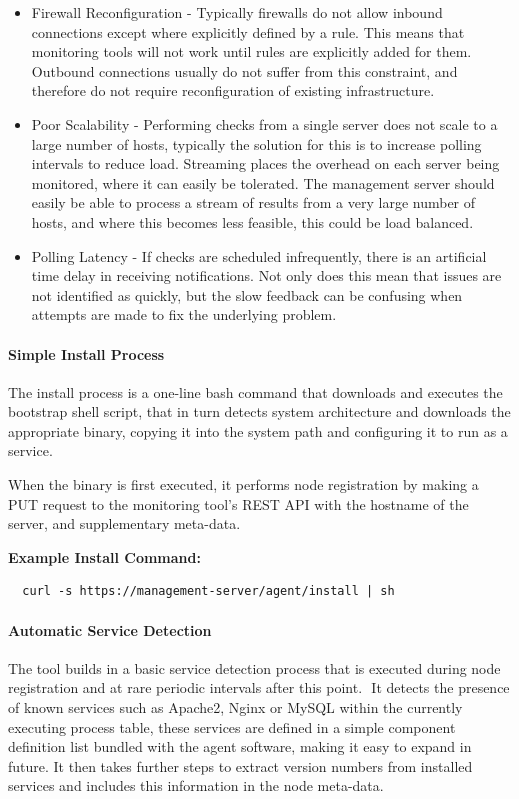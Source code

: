 \documentclass{cshonours}
\begin{document}
\begin{itemize}
  \item Firewall Reconfiguration - Typically firewalls do not allow inbound connections except where explicitly defined by a rule. This means that monitoring tools will not work until rules are explicitly added for them. Outbound connections usually do not suffer from this constraint, and therefore do not require reconfiguration of existing infrastructure.
  \item Poor Scalability - Performing checks from a single server does not scale to a large number of hosts, typically the solution for this is to increase polling intervals to reduce load. Streaming places the overhead on each server being monitored, where it can easily be tolerated. The management server should easily be able to process a stream of results from a very large number of hosts, and where this becomes less feasible, this could be load balanced.
  \item Polling Latency - If checks are scheduled infrequently, there is an artificial time delay in receiving notifications. Not only does this mean that issues are not identified as quickly, but the slow feedback can be confusing when attempts are made to fix the underlying problem.
\end{itemize}

\paragraph{Simple Install Process} The install process is a one-line bash command that downloads and executes the bootstrap shell script, that in turn detects system architecture and downloads the appropriate binary, copying it into the system path and configuring it to run as a service.

When the binary is first executed, it performs node registration by making a PUT request to the monitoring tool’s REST API with the hostname of the server, and supplementary meta-data.

\textbf{Example Install Command:}
\begin{verbatim}
  curl -s https://management-server/agent/install | sh
\end{verbatim}

\paragraph{Automatic Service Detection} The tool builds in a basic service detection process that is executed during node registration and at rare periodic intervals after this point.
 It detects the presence of known services such as Apache2, Nginx or MySQL within the currently executing process table, these services are defined in a simple component definition list bundled with the agent software, making it easy to expand in future. It then takes further steps to extract version numbers from installed services and includes this information in the node meta-data.
\end{document}
